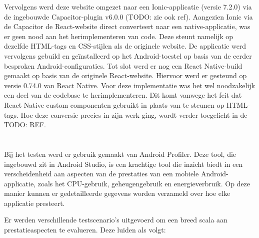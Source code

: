 Vervolgens werd deze website omgezet naar een Ionic-applicatie (versie 7.2.0) via de ingebouwde Capacitor-plugin v6.0.0 (TODO: zie ook ref). Aangezien Ionic via de Capacitor de React-website direct converteert naar een native-applicatie, was er geen nood aan het herimplementeren van code. Deze steunt namelijk op dezelfde HTML-tags en CSS-stijlen als de originele website. De applicatie werd vervolgens gebuild en geïnstalleerd op het Android-toestel op basis van de eerder besproken Android-configuraties. Tot slot werd er nog een React Native-build gemaakt op basis van de originele React-website. Hiervoor werd er gesteund op versie 0.74.0 van React Native. Voor deze implementatie was het wel noodzakelijk een deel van de codebase te herimplementeren. Dit komt vanwege het feit dat React Native custom componenten gebruikt in plaats van te steunen op HTML-tags. Hoe deze conversie precies in zijn werk ging, wordt verder toegelicht in de TODO: REF.

\section{}%
\label{sec:testen-en-resultaten}

Bij het testen werd er gebruik gemaakt van Android Profiler. Deze tool, die ingebouwd zit in Android Studio, is een krachtige tool die inzicht biedt in een verscheidenheid aan aspecten van de prestaties van een mobiele Android-applicatie, zoals het CPU-gebruik, geheugengebruik en energieverbruik. Op deze manier kunnen er gedetailleerde gegevens worden verzameld over hoe elke applicatie presteert.

Er werden verschillende testscenario's uitgevoerd om een breed scala aan prestatieaspecten te evalueren. Deze luiden als volgt:

